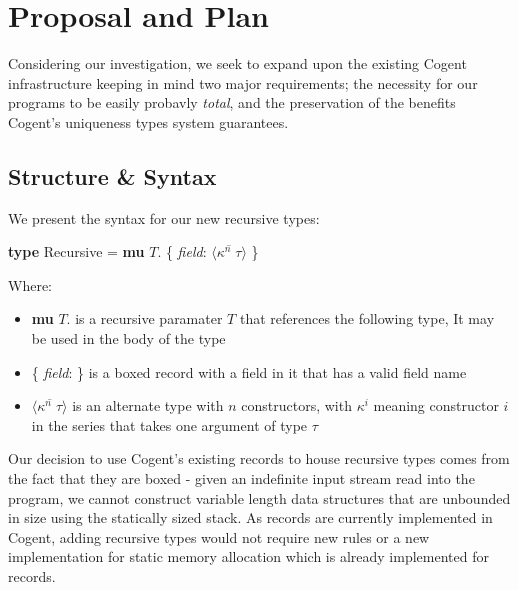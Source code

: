 \chapter{Proposal and Plan}\label{ch:style}

Considering our investigation, we seek to expand upon the existing Cogent infrastructure keeping in mind
two major requirements; the necessity for our programs to be easily probavly \textit{total}, and the preservation 
of the benefits Cogent's uniqueness types system guarantees.



\section{Structure \& Syntax}

We present the syntax for our new recursive types:

\begin{center}
    \textbf{type} Recursive = \textbf{mu} $T$. \{ \textit{field}: $\langle \overline{\kappa^n\; \tau} \rangle$ \}
\end{center}

Where:
\begin{itemize}
    \item
        \textbf{mu} $T$. is a recursive paramater $T$ that references the following type,
        It may be used in the body of the type
    \item
        \{ \textit{field}: \} is a boxed record with a field in it that has a valid field name
    \item 
        $\langle \overline{\kappa^n\; \tau} \rangle$ is an alternate type with $n$ constructors, 
        with $\kappa^i$ meaning constructor $i$ in the series that takes one argument of type $\tau$
\end{itemize}

Our decision to use Cogent's existing records to house recursive types comes from the fact that they are boxed - 
given an indefinite input stream read into the program, we cannot construct variable length data structures that
are unbounded in size using the statically sized stack. As records are currently implemented in Cogent,
adding recursive types would not require new rules or a new implementation for static memory allocation which
is already implemented for records.


